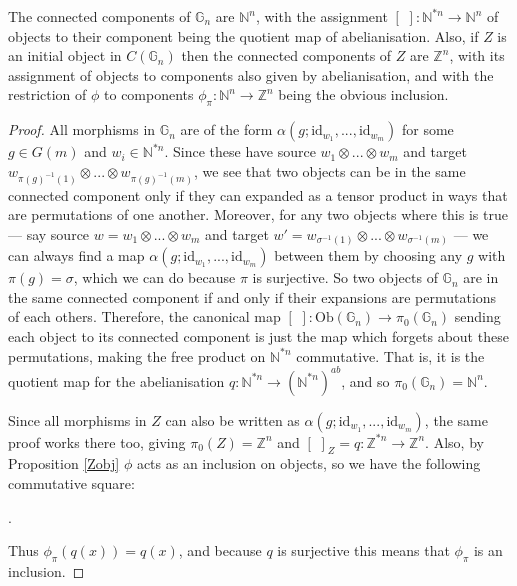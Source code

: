 \documentclass{amsart} %
\newenvironment{eq*}{\begin{equation*}}{\end{equation*}}
\begin{document}
\begin{prop}\label{concomp} The connected components of $\mathbb{G}_n$ are $\mathbb{N}^n$, with the assignment $[ \,\, ] : \mathbb{N}^{*n} \to \mathbb{N}^n$ of objects to their component being the quotient map of abelianisation. Also, if $Z$ is an initial object in $C(\mathbb{G}_n)$ then the connected components of $Z$ are $\mathbb{Z}^n$, with its assignment of objects to components also given by abelianisation, and with the restriction of $\phi$ to components $\phi_\pi : \mathbb{N}^n \to \mathbb{Z}^n$ being the obvious inclusion. 
\end{prop}
\begin{proof}All morphisms in $\mathbb{G}_n$ are of the form $\alpha(g; \mathrm{id}_{w_1}, ..., \mathrm{id}_{w_m})$ for some $g \in G(m)$ and $w_i \in \mathbb{N}^{*n}$. Since these have source $w_1 \otimes ... \otimes w_m$ and target $w_{\pi(g)^{-1}(1)} \otimes ... \otimes w_{\pi(g)^{-1}(m)}$, we see that two objects can be in the same connected component only if they can expanded as a tensor product in ways that are permutations of one another. Moreover, for any two objects where this is true --- say source $w = w_1 \otimes ... \otimes w_m$ and target $w' = w_{\sigma^{-1}(1)} \otimes ... \otimes w_{\sigma^{-1}(m)}$ --- we can always find a map $\alpha(g; \mathrm{id}_{w_1}, ..., \mathrm{id}_{w_m})$  between them by choosing any $g$ with $\pi(g) = \sigma$, which we can do because $\pi$ is surjective. So two objects of $\mathbb{G}_n$ are in the same connected component if and only if their expansions are permutations of each others. Therefore, the canonical map $[ \,\, ] : \mathrm{Ob}(\mathbb{G}_n) \to \pi_0(\mathbb{G}_n)$ sending each object to its connected component is just the map which forgets about these permutations, making the free product on $\mathbb{N}^{*n}$ commutative. That is, it is the quotient map for the abelianisation $q : \mathbb{N}^{*n} \to (\mathbb{N}^{*n})^{ab}$, and so $\pi_0(\mathbb{G}_n) = \mathbb{N}^n$. 

Since all morphisms in $Z$ can also be written as $\alpha(g; \mathrm{id}_{w_1}, ..., \mathrm{id}_{w_m})$, the same proof works there too, giving $\pi_0(Z) = \mathbb{Z}^n$ and $[ \,\, ]_Z = q : \mathbb{Z}^{*n} \to \mathbb{Z}^n$. Also, by Proposition \ref{Zobj} $\phi$ acts as an inclusion on objects, so we have the following commutative square:
\begin{eq*} .
\end{eq*}
Thus $\phi_\pi(q(x)) = q(x)$, and because $q$ is surjective this means that $\phi_\pi$ is an inclusion.
\end{proof}
\end{document}
